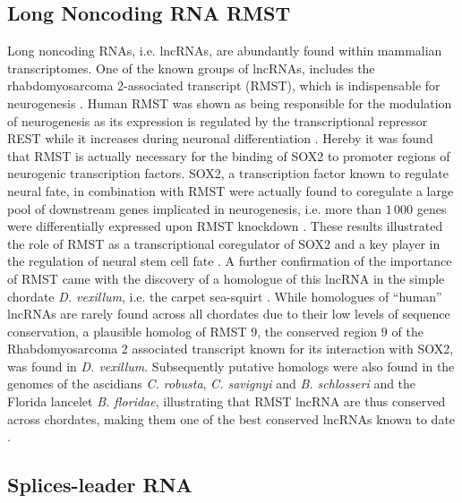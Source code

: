 \documentclass[graybox]{svmult}
\begin{document}
\subsection{Long Noncoding RNA RMST}

Long noncoding RNAs, i.e. lncRNAs, are abundantly found within mammalian 
transcriptomes. One of the known groups of lncRNAs, includes the 
rhabdomyosarcoma 2-associated transcript (RMST), which is indispensable for 
neurogenesis \cite{Bogu2013}. 
Human RMST was shown as being responsible for the modulation of neurogenesis as 
its expression is regulated by the transcriptional repressor REST while it 
increases during neuronal differentiation \cite{Bogu2013}. Hereby it was 
found that RMST is actually necessary for the binding of SOX2 to promoter 
regions of neurogenic transcription factors. SOX2, a transcription factor known 
to regulate neural fate, in combination with RMST were actually found to 
coregulate a large pool of downstream genes implicated in neurogenesis, i.e. 
more than $1\,000$ genes were differentially expressed upon RMST knockdown 
\cite{Bogu2013}. These results illustrated the role of RMST as a 
transcriptional coregulator of SOX2 and a key player in the regulation of 
neural stem cell fate \cite{Bogu2013}. A further confirmation of the importance 
of RMST came with the discovery of a homologue of this lncRNA in the simple 
chordate \textit{D. vexillum}, i.e. the carpet sea-squirt 
\cite{Velandia-Huerto2016}. While homologues of ``human'' lncRNAs are 
rarely found across all chordates due to their low levels of sequence 
conservation, a plausible homolog of RMST $9$, the conserved region $9$ of the 
Rhabdomyosarcoma 2 associated transcript known for its interaction with SOX2, 
was found in \textit{D. vexillum}. Subsequently putative homologs were also 
found in the genomes of the ascidians \textit{C. robusta}, \textit{C. 
savignyi} and \textit{B. schlosseri} and the Florida lancelet \textit{B. 
floridae}, illustrating that RMST lncRNA are thus conserved across chordates, 
making them one of the best conserved lncRNAs known to date 
\cite{Velandia-Huerto2016}.

\subsection{Splices-leader RNA}
\end{document}
